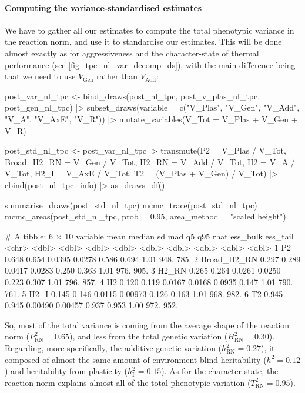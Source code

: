 \documentclass[a4paper,12pt,twoside]{article}
\begin{document}
\paragraph{Computing the variance-standardised estimates}
We have to gather all our estimates to compute the total phenotypic variance in the reaction norm, and use it to standardise our estimates.
This will be done almost exactly as for aggressiveness and the character-state of thermal performance (see \autoref{fig_tpc_nl_var_decomp_ds}), with the main difference being that we need to use $V_{\text{Gen}}$ rather than $V_{\text{Add}}$:
\begin{Rinput}
post_var_nl_tpc <-
    bind_draws(post_nl_tpc, post_v_plas_nl_tpc, post_gen_nl_tpc) |>
    subset_draws(variable = c("V_Plas", "V_Gen", "V_Add", "V_A", "V_AxE", "V_R")) |>
    mutate_variables(V_Tot = V_Plas + V_Gen + V_R)

post_std_nl_tpc <-
    post_var_nl_tpc |>
    transmute(P2            = V_Plas / V_Tot,
              Broad_H2_RN   = V_Gen / V_Tot,
              H2_RN         = V_Add / V_Tot,
              H2            = V_A / V_Tot,
              H2_I          = V_AxE / V_Tot,
              T2            = (V_Plas + V_Gen) / V_Tot) |>
    cbind(post_nl_tpc_info) |>
    as_draws_df()
    
summarise_draws(post_std_nl_tpc)
mcmc_trace(post_std_nl_tpc)
mcmc_areas(post_std_nl_tpc,
           prob = 0.95,
           area_method = "scaled height")
\end{Rinput}
\begin{Routput}
# A tibble: 6 × 10
  variable     mean median      sd     mad     q5   q95  rhat ess_bulk ess_tail
  <chr>       <dbl>  <dbl>   <dbl>   <dbl>  <dbl> <dbl> <dbl>    <dbl>    <dbl>
1 P2          0.648  0.654 0.0395  0.0278  0.586  0.694  1.01     948.     785.
2 Broad_H2_RN 0.297  0.289 0.0417  0.0283  0.250  0.363  1.01     976.     905.
3 H2_RN       0.265  0.264 0.0261  0.0250  0.223  0.307  1.01     796.     857.
4 H2          0.120  0.119 0.0167  0.0168  0.0935 0.147  1.01     790.     761.
5 H2_I        0.145  0.146 0.0115  0.00973 0.126  0.163  1.01     968.     982.
6 T2          0.945  0.945 0.00490 0.00457 0.937  0.953  1.00     972.     952.
\end{Routput}
So, most of the total variance is coming from the average shape of the reaction norm ($P^{2}_{\text{RN}} = 0.65$), and less from the total genetic variation ($H^{2}_{\text{RN}} = 0.30$).
Regarding, more specifically, the additive genetic variation ($h^{2}_{\text{RN}} = 0.27$), it composed of almost the same amount of environment-blind heritability ($h^{2}=0.12$) and heritability from plasticity ($h^{2}_{\text{I}} = 0.15$).
As for the character-state, the reaction norm explains almost all of the total phenotypic variation ($T^{2}_{\text{RN}}=0.95$).
\end{document}

